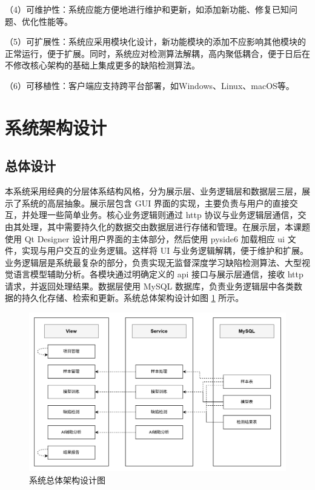 \documentclass[
  ]{njuthesis}
\begin{document}
（4）可维护性：系统应能方便地进行维护和更新，如添加新功能、修复已知问题、优化性能等。

（5）可扩展性：系统应采用模块化设计，新功能模块的添加不应影响其他模块的正常运行，便于扩展。同时，系统应对检测算法解耦，高内聚低耦合，便于日后在不修改核心架构的基础上集成更多的缺陷检测算法。

（6）可移植性：客户端应支持跨平台部署，如Windows、Linux、macOS等。

\section{系统架构设计}

\subsection{总体设计}

本系统采用经典的分层体系结构风格，分为展示层、业务逻辑层和数据层三层，展示了系统的高层抽象。展示层包含 GUI 界面的实现，主要负责与用户的直接交互，并处理一些简单业务。核心业务逻辑则通过 http 协议与业务逻辑层通信，交由其处理，其中需要持久化的数据交由数据层进行存储和管理。在展示层，本课题使用 Qt Designer 设计用户界面的主体部分，然后使用 pyside6 加载相应 ui 文件，实现与用户交互的业务逻辑。这样将 UI 与业务逻辑解耦，便于维护和扩展。业务逻辑层是系统最复杂的部分，负责实现无监督深度学习缺陷检测算法、大型视觉语言模型辅助分析。各模块通过明确定义的 api 接口与展示层通信，接收 http 请求，并返回处理结果。数据层使用 MySQL 数据库，负责业务逻辑层中各类数据的持久化存储、检索和更新。系统总体架构设计如图 \ref{系统总体架构设计图} 所示。

\begin{figure}[htb]
    \centering
    \includegraphics[width=\textwidth]{images/系统总体架构设计图.png}
    \caption{系统总体架构设计图}
    \label{系统总体架构设计图}
\end{figure}
\end{document}

